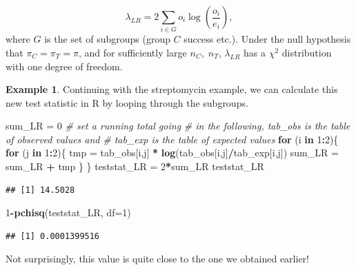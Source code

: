 \documentclass[
  openany]{book}
\newenvironment{Shaded}{\begin{snugshade}}{\end{snugshade}}
\newcommand{\AttributeTok}[1]{\textcolor[rgb]{0.13,0.29,0.53}{#1}}
\newcommand{\CommentTok}[1]{\textcolor[rgb]{0.56,0.35,0.01}{\textit{#1}}}
\newcommand{\ControlFlowTok}[1]{\textcolor[rgb]{0.13,0.29,0.53}{\textbf{#1}}}
\newcommand{\DecValTok}[1]{\textcolor[rgb]{0.00,0.00,0.81}{#1}}
\newcommand{\FunctionTok}[1]{\textcolor[rgb]{0.13,0.29,0.53}{\textbf{#1}}}
\newcommand{\NormalTok}[1]{#1}
\newcommand{\OtherTok}[1]{\textcolor[rgb]{0.56,0.35,0.01}{#1}}
\newcommand{\SpecialCharTok}[1]{\textcolor[rgb]{0.81,0.36,0.00}{\textbf{#1}}}
\theoremstyle{definition}
\theoremstyle{definition}
\newtheorem{example}{Example}[chapter]
\theoremstyle{definition}
\theoremstyle{definition}
\theoremstyle{remark}
\begin{document}
\[\lambda_{LR} = 2 \sum\limits_{i\in G} o_i \log\left(\frac{o_i}{e_i}\right),\]
where \(G\) is the set of subgroups (group \(C\) success etc.). Under the null hypothesis that \(\pi_C = \pi_T = \pi\), and for sufficiently large \(n_C,\;n_T\), \(\lambda_{LR}\) has a \(\chi^2\) distribution with one degree of freedom.

\begin{example}
Continuing with the streptomycin example, we can calculate this new test statistic in R by looping through the subgroups.

\begin{Shaded}
\begin{Highlighting}[]
\NormalTok{sum\_LR }\OtherTok{=} \DecValTok{0} \CommentTok{\# set a running total going }
\CommentTok{\# in the following, tab\_obs is the table of observed values and}
\CommentTok{\# tab\_exp is the table of expected values}
\ControlFlowTok{for}\NormalTok{ (i }\ControlFlowTok{in} \DecValTok{1}\SpecialCharTok{:}\DecValTok{2}\NormalTok{)\{}
  \ControlFlowTok{for}\NormalTok{ (j }\ControlFlowTok{in} \DecValTok{1}\SpecialCharTok{:}\DecValTok{2}\NormalTok{)\{}
\NormalTok{    tmp }\OtherTok{=}\NormalTok{ tab\_obs[i,j] }\SpecialCharTok{*} \FunctionTok{log}\NormalTok{(tab\_obs[i,j]}\SpecialCharTok{/}\NormalTok{tab\_exp[i,j])}
\NormalTok{    sum\_LR }\OtherTok{=}\NormalTok{ sum\_LR }\SpecialCharTok{+}\NormalTok{ tmp}
\NormalTok{  \}}
\NormalTok{\}}
\NormalTok{teststat\_LR }\OtherTok{=} \DecValTok{2}\SpecialCharTok{*}\NormalTok{sum\_LR}
\NormalTok{teststat\_LR}
\end{Highlighting}
\end{Shaded}

\begin{verbatim}
## [1] 14.5028
\end{verbatim}

\begin{Shaded}
\begin{Highlighting}[]
\DecValTok{1}\SpecialCharTok{{-}}\FunctionTok{pchisq}\NormalTok{(teststat\_LR, }\AttributeTok{df=}\DecValTok{1}\NormalTok{)}
\end{Highlighting}
\end{Shaded}

\begin{verbatim}
## [1] 0.0001399516
\end{verbatim}

Not surprisingly, this value is quite close to the one we obtained earlier!
\end{example}
\end{document}
